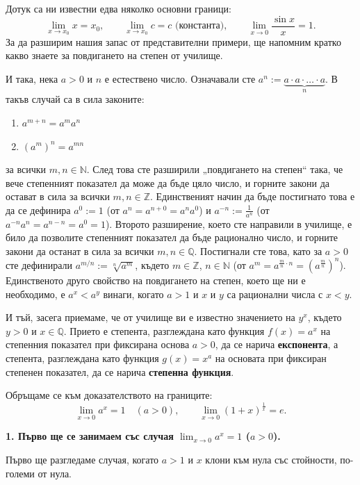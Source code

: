 Дотук са ни известни едва няколко основни граници:
\[
\lim_{x \to x_0} x = x_0, \qquad \lim_{x \to x_0} c = c \text{ (константа)}, \qquad \lim_{x \to 0} \frac{\sin x}{x} = 1.
\]
За да разширим нашия запас от представителни примери, ще напомним кратко какво знаете за повдигането на степен от училище.

И така, нека $a > 0$ и $n$ е естествено число. Означавали сте $a^n := \underbrace{a \cdot a \cdot \dots \cdot a}_{n}$. В такъв случай са в сила законите:
\begin{enumerate}
    \item $a^{m+n} = a^m a^n$
    \item $(a^m)^n = a^{mn}$
\end{enumerate}
за всички $m, n \in \mathbb{N}$. След това сте разширили „повдигането на степен“ така, че вече степенният показател да може да бъде цяло число, и горните закони да остават в сила за всички $m, n \in \mathbb{Z}$. Единственият начин да бъде постигнато това е да се дефинира $a^0 := 1$ (от $a^n = a^{n+0} = a^n a^0$) и $a^{-n} := \frac{1}{a^n}$ (от $a^{-n} a^n = a^{n-n} = a^0 = 1$). Второто разширение, което сте направили в училище, е било да позволите степенният показател да бъде рационално число, и горните закони да останат в сила за всички $m, n \in \mathbb{Q}$. Постигнали сте това, като за $a > 0$ сте дефинирали $a^{m/n} := \sqrt[n]{a^m}$, където $m \in \mathbb{Z}$, $n \in \mathbb{N}$ (от $a^m = a^{\frac{m}{n} \cdot n} = \left( a^{\frac{m}{n}} \right)^n$). Единственото друго свойство на повдигането на степен, което ще ни е необходимо, е $a^x < a^y$ винаги, когато $a > 1$ и $x$ и $y$ са рационални числа с $x < y$.

И тъй, засега приемаме, че от училище ви е известно значението на $y^x$, където $y > 0$ и $x \in \mathbb{Q}$. Прието е степента, разглеждана като функция $f(x) = a^x$ на степенния показател при фиксирана основа $a > 0$, да се нарича \textbf{експонента}, а степента, разглеждана като функция $g(x) = x^a$ на основата при фиксиран степенен показател, да се нарича \textbf{степенна функция}.

Обръщаме се към доказателството на границите:
\[
\lim_{x \to 0} a^x = 1 \quad (a > 0), \qquad \lim_{x \to 0} (1 + x)^{\frac{1}{x}} = e.
\]

\medskip
\noindent\textbf{1. Първо ще се занимаем със случая $\lim_{x \to 0} a^x = 1$ ($a > 0$).}

Първо ще разгледаме случая, когато $a > 1$ и $x$ клони към нула със стойности, по-големи от нула.

